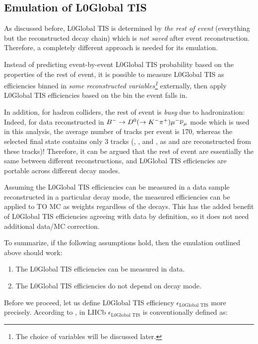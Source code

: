 \subsection{Emulation of L0Global TIS}

As discussed before, L0Global TIS is determined by \emph{the rest of event}
(everything but the reconstructed \B decay chain) which is \emph{not saved}
after event reconstruction.
Therefore, a completely different approach is needed for its emulation.

Instead of predicting event-by-event L0Global TIS probability based on the
properties of the rest of event, it is possible to measure L0Global TIS as
efficiencies binned in \emph{some reconstructed variables\footnote{
    The choice of variables will be discussed later.
}} externally,
then apply L0Global TIS efficiencies based on the bin the event falls in.

In addition, for hadron colliders,
the rest of event is \emph{busy} due to hadronization:
Indeed, for data reconstructed in
${{{B}^-}} \rightarrow {\ensuremath{{D}^0}} (\rightarrow {\ensuremath{{K}^-}} {\ensuremath{{\pi}^+}}) {\mu^-} {{\overline{\nu}}_\mu}$ mode which is used in
this analysis,
the average number of tracks per event is 170,
whereas the selected \Dz\mun final state contains only 3 tracks (\Km, \pip, and
\mun, as \Dz and \Bm are reconstructed from these tracks)!
Therefore, it can be argued that the rest of event are essentially the same
between different reconstructions,
and L0Global TIS efficiencies are portable across different \B decay modes.

Assuming the L0Global TIS efficiencies can be measured in a data
sample reconstructed in a particular decay mode, the measured efficiencies
can be applied to TO MC as weights regardless of the decays.
This has the added benefit of L0Global TIS efficiencies agreeing with data by
definition, so it does not need additional data/MC correction.

To summarize, if the following assumptions hold, then the emulation outlined
above should work:

\begin{enumerate}
    \item The L0Global TIS efficiencies can be measured in data.
    \item The L0Global TIS efficiencies do not depend on \B decay mode.
\end{enumerate}

Before we proceed, let us define L0Global TIS efficiency
$\epsilon_\text{L0Global TIS}$ more precisely.
According to \cite{LHCb-PUB-2014-039}, in LHCb $\epsilon_\text{L0Global TIS}$
is conventionally defined as:

